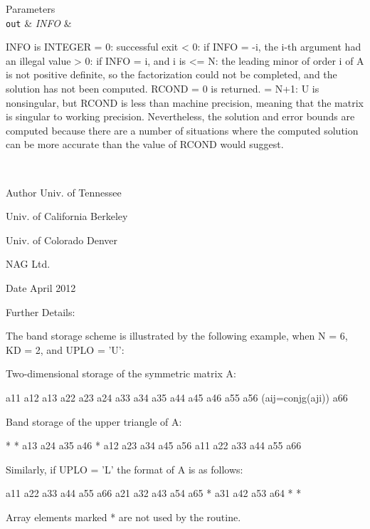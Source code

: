 \begin{DoxyParams}[1]{Parameters}
\\
\hline
\mbox{\tt out}  & {\em I\+N\+F\+O} & \begin{DoxyVerb}          INFO is INTEGER
          = 0:  successful exit
          < 0:  if INFO = -i, the i-th argument had an illegal value
          > 0:  if INFO = i, and i is
                <= N:  the leading minor of order i of A is
                       not positive definite, so the factorization
                       could not be completed, and the solution has not
                       been computed. RCOND = 0 is returned.
                = N+1: U is nonsingular, but RCOND is less than machine
                       precision, meaning that the matrix is singular
                       to working precision.  Nevertheless, the
                       solution and error bounds are computed because
                       there are a number of situations where the
                       computed solution can be more accurate than the
                       value of RCOND would suggest.\end{DoxyVerb}
 \\
\hline
\end{DoxyParams}
\begin{DoxyAuthor}{Author}
Univ. of Tennessee 

Univ. of California Berkeley 

Univ. of Colorado Denver 

N\+A\+G Ltd. 
\end{DoxyAuthor}
\begin{DoxyDate}{Date}
April 2012 
\end{DoxyDate}
\begin{DoxyParagraph}{Further Details\+: }
\begin{DoxyVerb}  The band storage scheme is illustrated by the following example, when
  N = 6, KD = 2, and UPLO = 'U':

  Two-dimensional storage of the symmetric matrix A:

     a11  a12  a13
          a22  a23  a24
               a33  a34  a35
                    a44  a45  a46
                         a55  a56
     (aij=conjg(aji))         a66

  Band storage of the upper triangle of A:

      *    *   a13  a24  a35  a46
      *   a12  a23  a34  a45  a56
     a11  a22  a33  a44  a55  a66

  Similarly, if UPLO = 'L' the format of A is as follows:

     a11  a22  a33  a44  a55  a66
     a21  a32  a43  a54  a65   *
     a31  a42  a53  a64   *    *

  Array elements marked * are not used by the routine.\end{DoxyVerb}
 
\end{DoxyParagraph}
